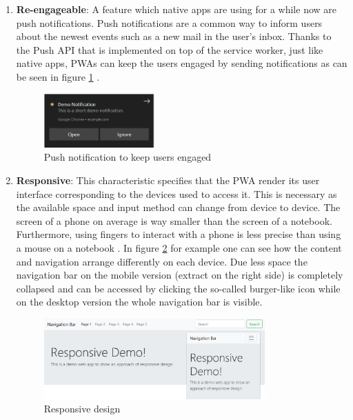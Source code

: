 \begin{enumerate}
	\item \textbf{Re-engageable}: A feature which native apps are using for a while now are push notifications. Push notifications are a common way to inform users about the newest events such as a new mail in the user’s inbox. Thanks to the Push API that is implemented on top of the service worker, just like native apps, PWAs can keep the users engaged by sending notifications as can be seen in figure \ref{fig:pwa_reengageable} \cite[p. 201]{hajianProgressiveWebApps2019}.

\begin{figure}[htbp] 
	\centering
	\includegraphics[width=0.4\textwidth]{Assets/chapter_pwa/demonotification.PNG}
	\caption{Push notification to keep users engaged}
	\label{fig:pwa_reengageable}
\end{figure}

	\item \textbf{Responsive}: This characteristic specifies that the PWA render its user interface corresponding to the devices used to access it. This is necessary as the available space and input method can change from device to device. The screen of a phone on average is way smaller than the screen of a notebook. Furthermore, using fingers to interact with a phone is less precise than using a mouse on a notebook \cite[pp. 115-116]{liebelProgressiveWebApps2019}. In figure \ref{fig:pwa_responsive} for example one can see how the content and navigation arrange differently on each device. Due less space the navigation bar on the mobile version (extract on the right side) is completely collapsed and can be accessed by clicking the so-called burger-like icon while on the desktop version the whole navigation bar is visible.

\begin{figure}[htbp] 
	\centering
	\includegraphics[width=0.8\textwidth]{Assets/chapter_pwa/responsive-overall.jpg}
	\caption{Responsive design}
	\label{fig:pwa_responsive}
\end{figure}


\end{enumerate}
